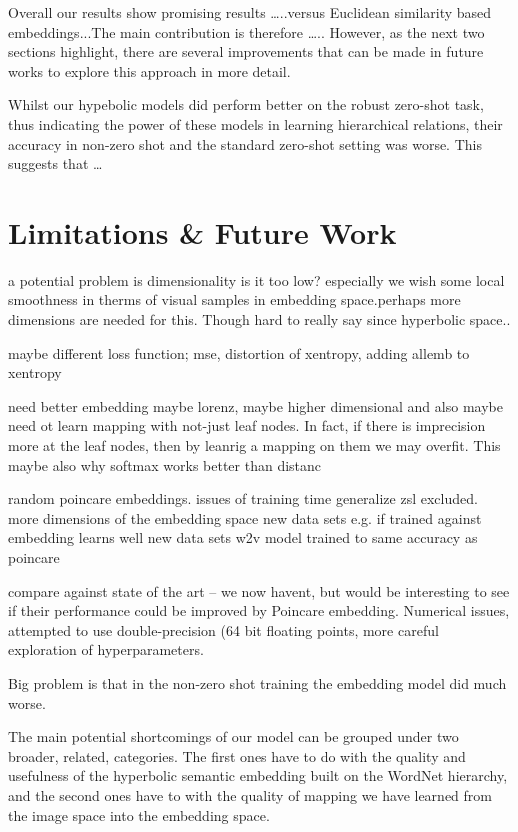 \documentclass[12pt]{report}
\begin{document}
Overall our results show promising results \dots..versus Euclidean similarity based embeddings...The main contribution is therefore \dots.. However, as the next two sections highlight, there are several improvements that can be made in future works to explore this approach in more detail.

Whilst our hypebolic models did perform better on the robust zero-shot task, thus indicating the power of these models in learning hierarchical relations, their accuracy in non-zero shot and the standard zero-shot setting was worse. This suggests that \dots 

\section{Limitations \& Future Work}


a potential problem is dimensionality is it too low? especially we wish some local smoothness in therms of visual samples in embedding space.perhaps more dimensions are needed for this. Though hard to really say since hyperbolic space..

maybe different loss function; mse, distortion of xentropy, adding allemb to xentropy

need better embedding maybe lorenz, maybe higher dimensional and also maybe need ot learn mapping with not-just leaf nodes. In fact, if there is imprecision more at the leaf nodes, then by leanrig a mapping on them we may overfit. This maybe also why softmax works better than distanc

random poincare embeddings.
issues of training time
generalize zsl excluded.
more dimensions of the embedding space
new data sets e.g. if trained against embedding learns well new data sets
w2v model trained to same accuracy as poincare  

compare against state of the art -- we now havent, but would be interesting to see if their performance could be improved by Poincare embedding.
Numerical issues, attempted to use double-precision (64 bit floating points, more careful exploration of hyperparameters.












Big problem is that in the non-zero shot training the embedding model did much worse.

The main potential shortcomings of our model can be grouped under two broader, related, categories. The first ones have to do with the quality and usefulness of the hyperbolic semantic embedding built on the WordNet hierarchy, and the second ones have to with the quality of mapping we have learned from the image space into the embedding space.
\end{document}
